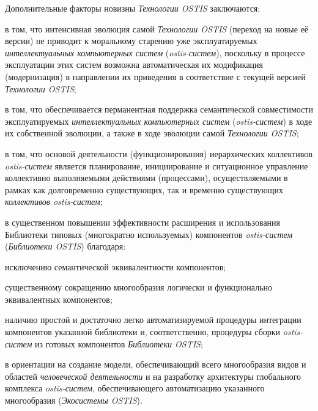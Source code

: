 Дополнительные факторы новизны \textit{Технологии OSTIS} заключаются: 
\begin{textitemize}
	\item в том, что интенсивная эволюция самой \textit{Технологии OSTIS} (переход на новые её версии) не приводит к моральному старению уже эксплуатируемых \textit{интеллектуальных компьютерных систем} (\textit{ostis-систем}), поскольку в процессе эксплуатации этих систем возможна автоматическая их модификация (модернизация) в направлении их приведения в соответствие с текущей версией \textit{Технологии OSTIS}; 
	\item в том, что обеспечивается перманентная поддержка семантической совместимости эксплуатируемых \textit{интеллектуальных компьютерных систем} (\textit{ostis-систем}) в ходе их собственной эволюции, а также в ходе эволюции самой \textit{Технологии OSTIS}; 
	\item в том, что основой деятельности (функционирования) иерархических коллективов \textit{ostis-систем} является  планирование, инициирование и ситуационное управление коллективно выполняемыми действиями (процессами), осуществляемыми в рамках как долговременно существующих, так и временно существующих \textit{коллективов ostis-систем}; 
	\item в существенном повышении эффективности расширения и использования Библиотеки типовых (многократно используемых) компонентов \textit{ostis-систем} (\textit{Библиотеки OSTIS}) благодаря: 
	\begin{textitemize}
		\item исключению семантической эквивалентности компонентов;
		\item существенному сокращению многообразия логически и функционально эквивалентных компонентов; 
		\item наличию простой и достаточно легко автоматизируемой процедуры интеграции компонентов указанной библиотеки и, соответственно, процедуры сборки \textit{ostis-систем} из готовых компонентов \textit{Библиотеки OSTIS}; 
	\end{textitemize}
	\item  в ориентации на создание  модели, обеспечивающий  всего многообразия видов и областей \textit{человеческой деятельности} и на разработку архитектуры глобального комплекса \textit{ostis-систем}, обеспечивающего автоматизацию указанного многообразия (\textit{Экосистемы OSTIS}).
\end{textitemize}

